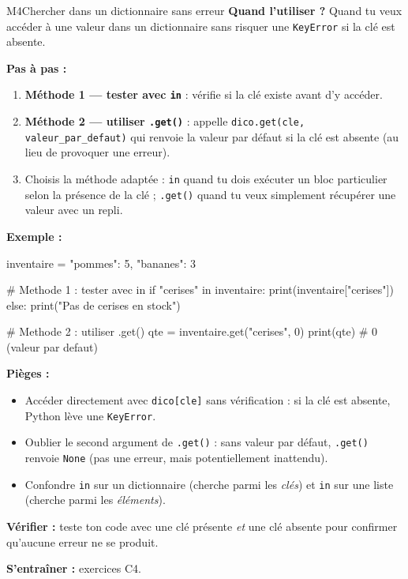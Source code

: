 \begin{fichemethode}{M4}{Chercher dans un dictionnaire sans erreur}
\textbf{Quand l'utiliser ?} Quand tu veux accéder à une valeur dans un dictionnaire sans risquer une \lstinline{KeyError} si la clé est absente.

\textbf{Pas à pas :}
\begin{enumerate}
  \item \textbf{Méthode 1 — tester avec \lstinline{in}} : vérifie si la clé existe avant d'y accéder.
  \item \textbf{Méthode 2 — utiliser \lstinline{.get()}} : appelle \lstinline{dico.get(cle, valeur_par_defaut)} qui renvoie la valeur par défaut si la clé est absente (au lieu de provoquer une erreur).
  \item Choisis la méthode adaptée : \lstinline{in} quand tu dois exécuter un bloc particulier selon la présence de la clé ; \lstinline{.get()} quand tu veux simplement récupérer une valeur avec un repli.
\end{enumerate}

\textbf{Exemple :}
\begin{python}
inventaire = {"pommes": 5, "bananes": 3}

# Methode 1 : tester avec in
if "cerises" in inventaire:
    print(inventaire["cerises"])
else:
    print("Pas de cerises en stock")

# Methode 2 : utiliser .get()
qte = inventaire.get("cerises", 0)
print(qte)  # 0 (valeur par defaut)
\end{python}

\textbf{Pièges :}
\begin{itemize}
  \item Accéder directement avec \lstinline{dico[cle]} sans vérification : si la clé est absente, Python lève une \lstinline{KeyError}.
  \item Oublier le second argument de \lstinline{.get()} : sans valeur par défaut, \lstinline{.get()} renvoie \lstinline{None} (pas une erreur, mais potentiellement inattendu).
  \item Confondre \lstinline{in} sur un dictionnaire (cherche parmi les \emph{clés}) et \lstinline{in} sur une liste (cherche parmi les \emph{éléments}).
\end{itemize}

\textbf{Vérifier :} teste ton code avec une clé présente \emph{et} une clé absente pour confirmer qu'aucune erreur ne se produit.

\textbf{S'entraîner :} exercices C4.
\end{fichemethode}
